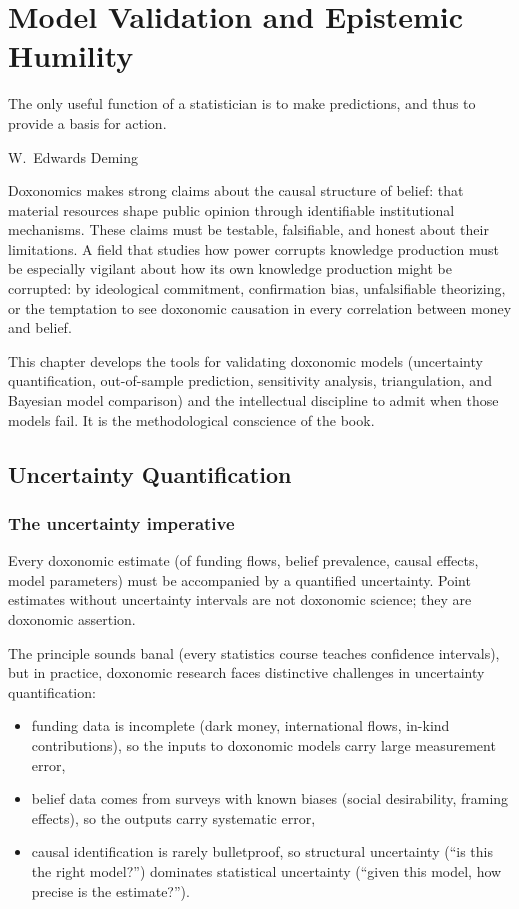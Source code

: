 \chapter{Model Validation and Epistemic Humility}
\label{ch:model-validation}

\epigraph{The only useful function of a statistician is to make predictions, and thus to provide a basis for action.}{W.\ Edwards Deming}

\noindent
Doxonomics makes strong claims about the causal structure of belief: that material resources shape public opinion through identifiable institutional mechanisms.
These claims must be testable, falsifiable, and honest about their limitations.
A field that studies how power corrupts knowledge production must be especially vigilant about how its own knowledge production might be corrupted: by ideological commitment, confirmation bias, unfalsifiable theorizing, or the temptation to see doxonomic causation in every correlation between money and belief.

This chapter develops the tools for validating doxonomic models (uncertainty quantification, out-of-sample prediction, sensitivity analysis, triangulation, and Bayesian model comparison) and the intellectual discipline to admit when those models fail.
It is the methodological conscience of the book.

\section{Uncertainty Quantification}
\label{sec:ch20-uncertainty}

\subsection{The uncertainty imperative}

\begin{principle}
\label{prin:uncertainty}
Every doxonomic estimate (of funding flows, belief prevalence, causal effects, model parameters) must be accompanied by a quantified uncertainty.
Point estimates without uncertainty intervals are not doxonomic science; they are doxonomic assertion.
\end{principle}

The principle sounds banal (every statistics course teaches confidence intervals), but in practice, doxonomic research faces distinctive challenges in uncertainty quantification:
\begin{itemize}[nosep]
  \item funding data is incomplete (dark money, international flows, in-kind contributions), so the inputs to doxonomic models carry large measurement error,
  \item belief data comes from surveys with known biases (social desirability, framing effects), so the outputs carry systematic error,
  \item causal identification is rarely bulletproof, so structural uncertainty (``is this the right model?'') dominates statistical uncertainty (``given this model, how precise is the estimate?'').
\end{itemize}

